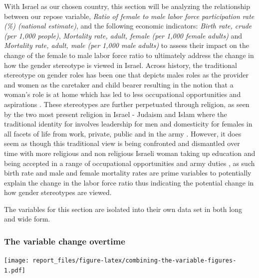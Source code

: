 \documentclass[11pt,a4paper,]{article}
\let\origfigure\figure
\let\endorigfigure\endfigure
\renewenvironment{figure}[1][2] {
    \expandafter\origfigure\expandafter[H]
} {
    \endorigfigure
}%
\begin{document}
With Israel as our chosen country, this section will be analyzing the
relationship between our repose variable, \emph{Ratio of female to male
labor force participation rate (\%) (national estimate)}, and the
following economic indicators: \emph{Birth rate, crude (per 1,000
people)}, \emph{Mortality rate, adult, female (per 1,000 female adults)}
and \emph{Mortality rate, adult, male (per 1,000 male adults)} to assess
their impact on the change of the female to male labor force ratio to
ultimately address the change in how the gender stereotype is viewed in
Israel. Across history, the traditional stereotype on gender roles has
been one that depicts males roles as the provider and women as the
caretaker and child bearer resulting in the notion that a woman's role
is at home which has led to less occupational opportunities and
aspirations \textcite{GenderRoles}. These stereotypes are further
perpetuated through religion, as seen by the two most present religion
in Israel - Judaism and Islam where the traditional identity for
involves leadership for men and domesticity for females
\textcite{Woodhead} in all facets of life from work, private, public and
in the army \textcite{ServiceIDF}. However, it does seem as though this
traditional view is being confronted and dismantled over time with more
religious and non religious Israeli woman taking up education and being
accepted in a range of occupational opportunities and army duties
\textcite{Levy2006}, as such birth rate and male and female mortality
rates are prime variables to potentially explain the change in the labor
force ratio thus indicating the potential change in how gender
stereotypes are viewed.

The variables for this section are isolated into their own data set in
both long and wide form.

\subsubsection{The variable change
overtime}\label{the-variable-change-overtime}

\begin{figure}
\centering
\texttt{[image: report\_files/figure-latex/combining-the-variable-figures-1.pdf]}
\caption{\label{fig:combining-the-variable-figures}Each figure visualises
the chosen variables}
\end{figure}
\end{document}
